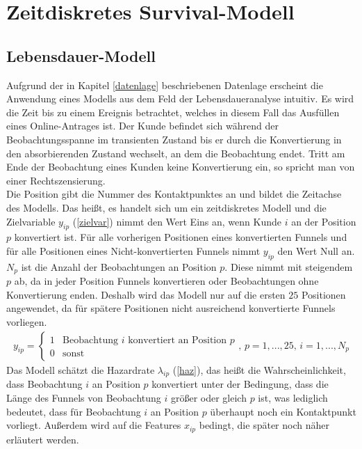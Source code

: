 \section{Zeitdiskretes Survival-Modell}\label{survival}

\subsection{Lebensdauer-Modell}\label{secModel1}

Aufgrund der in Kapitel \ref{datenlage} beschriebenen Datenlage erscheint die Anwendung eines Modells aus dem Feld der Lebensdaueranalyse intuitiv. Es wird die Zeit bis zu einem Ereignis betrachtet, welches in diesem Fall das Ausfüllen eines Online-Antrages ist. Der Kunde befindet sich während der Beobachtungsspanne im transienten Zustand bis er durch die Konvertierung in den absorbierenden Zustand wechselt, an dem die Beobachtung endet. Tritt am Ende der Beobachtung eines Kunden keine Konvertierung ein, so spricht man von einer Rechtszensierung.\\
Die Position gibt die Nummer des Kontaktpunktes an und bildet die Zeitachse des Modells. Das heißt, es handelt sich um ein zeitdiskretes Modell und die Zielvariable $y_{ip}$ (\ref{zielvar}) nimmt den Wert Eins an, wenn Kunde $i$ an der Position $p$ konvertiert ist. Für alle vorherigen Positionen eines konvertierten Funnels und für alle Positionen eines Nicht-konvertierten Funnels nimmt $y_{ip}$ den Wert Null an. $N_p$ ist die Anzahl der Beobachtungen an Position $p$. Diese nimmt mit steigendem $p$ ab, da in jeder Position Funnels konvertieren oder Beobachtungen ohne Konvertierung enden. Deshalb wird das Modell nur auf die ersten $25$ Positionen angewendet, da für spätere Positionen nicht ausreichend konvertierte Funnels vorliegen.\\
\begin{align}
	y_{ip} = \begin{cases} 1 & \text{Beobachtung } i \text{ konvertiert an Position } p\\
												 0 & \text{sonst} 
					 \end{cases} \text{, } p=1,...,25 \text{, } i=1,...,N_p \label{zielvar}
\end{align}
Das Modell schätzt die Hazardrate $\lambda_{ip}$ (\ref{haz}), das heißt die Wahrscheinlichkeit, dass Beobachtung $i$ an Position $p$ konvertiert unter der Bedingung, dass die Länge des Funnels von Beobachtung $i$ größer oder gleich $p$ ist, was lediglich bedeutet, dass für Beobachtung $i$ an Position $p$ überhaupt noch ein Kontaktpunkt vorliegt. Außerdem wird auf die Features $x_{ip}$ bedingt, die später noch näher erläutert werden.
